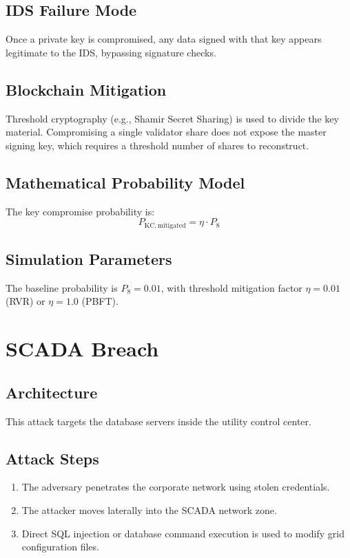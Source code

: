 \documentclass[12pt, oneside, a4paper]{report}
\theoremstyle{definition}
\theoremstyle{remark}
\begin{document}
\subsection{IDS Failure Mode}
Once a private key is compromised, any data signed with that key appears legitimate to the IDS, bypassing signature checks.

\subsection{Blockchain Mitigation}
Threshold cryptography (e.g., Shamir Secret Sharing) is used to divide the key material. Compromising a single validator share does not expose the master signing key, which requires a threshold number of shares to reconstruct.

\subsection{Mathematical Probability Model}
The key compromise probability is:
\begin{equation}
P_{\mathrm{KC,mitigated}} = \eta \cdot P_8
\end{equation}

\subsection{Simulation Parameters}
The baseline probability is $P_8 = 0.01$, with threshold mitigation factor $\eta = 0.01$ (RVR) or $\eta = 1.0$ (PBFT).

\bigskip

\section{SCADA Breach}
\label{sec:tm:scada_breach}

\subsection{Architecture}
This attack targets the database servers inside the utility control center.

\subsection{Attack Steps}
\begin{enumerate}
  \item The adversary penetrates the corporate network using stolen credentials.
  \item The attacker moves laterally into the SCADA network zone.
  \item Direct SQL injection or database command execution is used to modify grid configuration files.
\end{enumerate}
\end{document}
